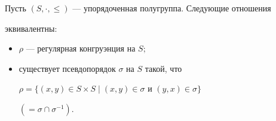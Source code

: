  


\begin{prop} 


Пусть $(S,\cdot,\le)$ --- упорядоченная полугруппа. Следующие отношения 


эк\-ви\-ва\-лентны$:$ 


\begin{itemize} 


\item[1)] $\rho$ --- регулярная конгруэнция на $S;$ 


\item[2)] существует псевдопорядок $\sigma$ на $S$ такой, что 


$\rho=\{(x,y)\in S\times S\mid(x,y)\in \sigma$ и $(y,x)\in\sigma\}$ 


$(=\sigma\cap\sigma^{-1})$. 


\end{itemize} 


\end{prop} 


 



